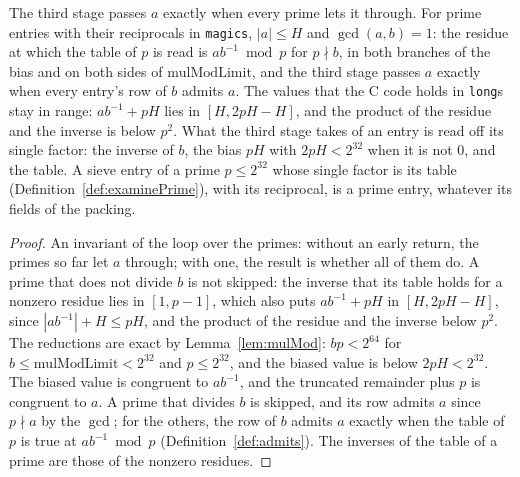 \begin{lemma}\label{lem:stage3}
  \leanok
  The third stage passes $a$ exactly when every prime lets it through. For prime entries with their
  reciprocals in \verb|magics|, $|a| \le H$ and $\gcd(a, b) = 1$: the residue at which the table of
  $p$ is read is $a b^{-1} \bmod p$ for $p \nmid b$, in both branches of the bias and on both sides
  of $\mathrm{mulModLimit}$, and the third stage passes $a$ exactly when every entry's row of $b$
  admits $a$. The values that the C code holds in \verb|long|s stay in range: $a b^{-1} + p H$ lies
  in $[H, 2 p H - H]$, and the product of the residue and the inverse is below $p^2$. What the third
  stage takes of an entry is read off its single factor: the inverse of $b$, the bias $p H$ with
  $2 p H < 2^{32}$ when it is not $0$, and the table. A sieve entry of a prime $p \le 2^{32}$ whose
  single factor is its table (Definition~\ref{def:examinePrime}), with its reciprocal, is a prime
  entry, whatever its fields of the packing.
\end{lemma}

\begin{proof}
  \leanok
  An invariant of the loop over the primes: without an early return, the primes so far let $a$
  through; with one, the result is whether all of them do. A prime that does not divide $b$ is not
  skipped: the inverse that its table holds for a nonzero residue lies in $[1, p - 1]$, which also
  puts $a b^{-1} + p H$ in $[H, 2 p H - H]$, since $|a b^{-1}| + H \le p H$, and the product of the
  residue and the inverse below $p^2$. The reductions are exact by Lemma~\ref{lem:mulMod}: $b p <
  2^{64}$ for $b \le \mathrm{mulModLimit} < 2^{32}$ and $p \le 2^{32}$, and the biased value is
  below $2 p H < 2^{32}$. The biased value is congruent to $a b^{-1}$, and the truncated remainder
  plus $p$ is congruent to $a$. A prime that divides $b$ is skipped, and its row admits $a$ since $p
  \nmid a$ by the $\gcd$; for the others, the row of $b$ admits $a$ exactly when the table of $p$ is
  true at $a b^{-1} \bmod p$ (Definition~\ref{def:admits}). The inverses of the table of a prime are
  those of the nonzero residues.
\end{proof}

